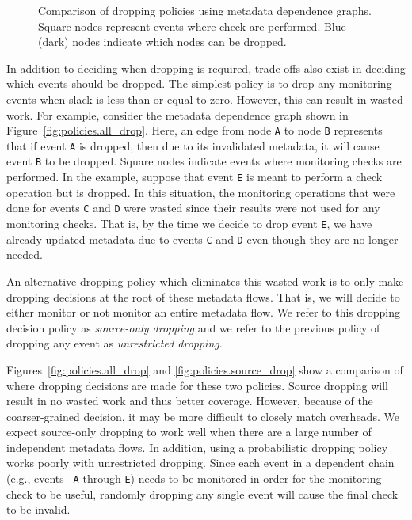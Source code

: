 \begin{figure}
\begin{center}
{    \label{fig:policies.source_drop}
  }
  \vspace{-0.1in}
  \end{center}
  \caption{Comparison of dropping policies using metadata dependence graphs.
  Square nodes represent events where check are performed. Blue (dark) nodes
  indicate which nodes can be dropped.}
  \label{fig:policies.policies}
\end{figure}

In addition to deciding when dropping is required, trade-offs also exist in
deciding which events should be dropped.
The simplest policy is to drop any monitoring events when slack is less than or equal to zero.  However, this can result in
wasted work. For example, consider the metadata dependence graph shown in
Figure~\ref{fig:policies.all_drop}. Here, an edge from node {\tt A} to node
{\tt B} represents that if event {\tt A} is dropped, then due to its
invalidated metadata, it will cause event {\tt B} to be dropped. Square
nodes indicate events where monitoring checks are performed. In the
example, suppose that event {\tt E} is meant to perform a check operation but is dropped.
In this situation, the
monitoring operations that were done for events {\tt C} and {\tt D} were wasted
since their results were not used for any monitoring checks.
That is, by the time we decide to drop event {\tt E}, we have already 
updated metadata due to events {\tt C} and {\tt D} even though they are no longer needed.

An alternative dropping policy which eliminates this wasted work is to only make dropping decisions at
the root of these metadata flows. That is, we will decide to either monitor or
not monitor an entire metadata flow. We refer to this dropping decision policy
as \emph{source-only dropping} and we refer to the previous policy of 
dropping any event as \emph{unrestricted dropping}.

Figures~\ref{fig:policies.all_drop} and \ref{fig:policies.source_drop} show a
comparison of where dropping decisions are made for these two policies. Source
dropping will
result in no wasted work and thus better coverage. However, because of the coarser-grained decision, it
may be more difficult to closely match overheads. We expect source-only dropping 
to work well when there are a large number of independent metadata flows.
In addition, using a probabilistic dropping policy works poorly with
unrestricted dropping. Since each event in a dependent chain (e.g., events {\tt
A} through {\tt E}) needs to be monitored in order for the monitoring check to
be useful, randomly dropping any single event will cause the final check to be
invalid.

